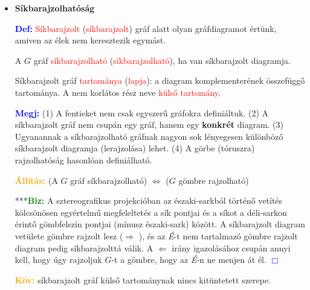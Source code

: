 \documentclass[../../szobeli.tex]{subfiles}
\begin{document}
\begin{center}
    \noindent{}
\end{center}

    \begin{itemize}

        \iffalse

        \item \textbf{Síkbarajzolhatóság}

            \textcolor{blue}{\textbf{Def:}} \textcolor{red}{Síkbarajzolt} (\textcolor{red}{síkbarajzolt}) gráf alatt olyan gráfdiagramot értünk, amiven az  élek nem keresztezik egymást.

            A $G$ gráf \textcolor{red}{síkbarajzolható} (\textcolor{red}{síkbarajzolható}), ha van síkbarajzolt diagramja. 

            Síkbarajzolt gráf \textcolor{red}{tartománya} (\textcolor{red}{lapja}): a diagram komplementerének összefüggő tartománya. A nem korlátos rész neve \textcolor{red}{külső tartomány}. 

            \textcolor{blue}{\textbf{Megj:}} (1) A fentieket nem csak egyszerű gráfokra definiáltuk. (2) A síkbarajzolt gráf nem csupán egy gráf, hanem egy \textbf{konkrét} diagram. (3) Ugyanannak a síkbarajzolható gráfnak nagyon sok lényegesen különböző síkbarajzolt diagramja (lerajzolása) lehet. (4) A görbe (tóruszra) rajzolhatóság hasonlóan definiálható.

            \textcolor{orange}{\textbf{Állítás:}} (A $G$ gráf síkbarajzolható) $\Longleftrightarrow$ ($G$ gömbre rajzolható) 

            ***\textcolor{green}{\textbf{Biz:}} A sztereografikus projekcióban az északi-sarkból történő vetítés kölcsönösen egyértelmű megfeleltetés a sík pontjai és a síkot a déli-sarkon érintő gömbfelszín pontjai (mínusz északi-sark) között. A síkbarajzolt diagram vetülete gömbre rajzolt lesz ($\Rightarrow$ \checkmark), és az \textit{É}-t nem tartalmazó gömbre rajzolt diagram pedig síkbarajzolttá válik. A $\Leftarrow$ irány igazolásához csupán annyi kell, hogy úgy rajzoljuk $G$-t a gömbre, hogy az \textit{É}-n ne menjen át él. \textcolor{blue}{$\Box$}

            \textcolor{orange}{\textbf{Köv:}} síkbarajzolt gráf külső tartománynak nincs kitüntetett szerepe.


\end{itemize}
\end{document}
